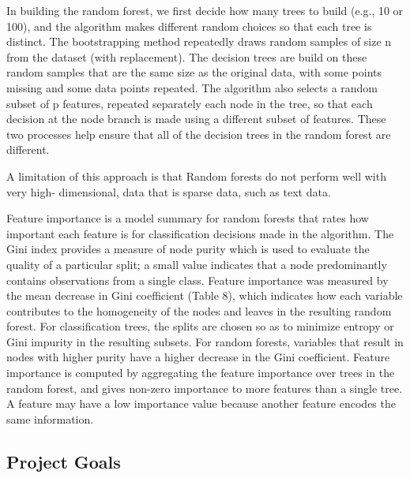 \documentclass[sigconf]{acmart}
\begin{document}
In building the random forest, we first decide how many trees to build (e.g., 10 
or 100), and the algorithm makes different random choices so that each tree is 
distinct. The bootstrapping method repeatedly draws random samples of size n 
from the dataset (with replacement). The decision trees are build on these 
random samples that are the same size as the original data, with some points 
missing and some data points repeated. The algorithm also selects a random 
subset of p features, repeated separately each node in the tree, so that 
each decision at the node branch is made using a different subset of features.
These two processes help ensure that all of the decision trees in the random
forest are different. 

 A limitation of 
this approach is that Random forests do not perform well with very high-
dimensional, data that is sparse data, such as text data.



Feature importance is a model summary for random forests 
that rates how important each feature is for classification decisions made 
in the algorithm. The Gini index provides a measure of node purity which is 
used to evaluate the quality of a particular split; a small value indicates 
that a node predominantly contains observations from a single class. 
Feature importance was measured by the mean decrease in Gini coefficient 
(Table 8), which indicates how each variable contributes to the homogeneity 
of the nodes and leaves in the resulting random forest. For classification 
trees, the splits are chosen so as to minimize entropy or Gini impurity in 
the resulting subsets. For random forests, variables that result in nodes 
with higher purity have a higher decrease in the Gini coefficient. Feature 
importance is computed by aggregating the feature importance over trees in 
the random forest, and gives non-zero importance to more features than a 
single tree. A feature may have a low importance value because another feature 
encodes the same information. 

\subsection{Project Goals} 
\end{document}
